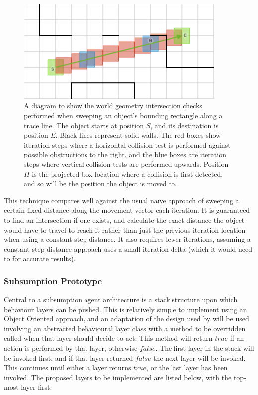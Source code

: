 \documentclass[12pt,a4paper]{article}
\begin{document}
\begin{figure}[h]
\centering
\includegraphics[width=0.9\textwidth]{trace}
\caption{A diagram to show the world geometry intersection checks performed when sweeping an object's bounding rectangle along a trace line. The object starts at position $S$, and its destination is position $E$. Black lines represent solid walls. The red boxes show iteration steps where a horizontal collision test is performed against possible obstructions to the right, and the blue boxes are iteration steps where vertical collision tests are performed upwards. Position $H$ is the projected box location where a collision is first detected, and so will be the position the object is moved to.}
\label{fig:trace}
\end{figure}

This technique compares well against the usual na\"{i}ve approach of sweeping a certain fixed distance along the movement vector each iteration. It is guaranteed to find an intersection if one exists, and calculate the exact distance the object would have to travel to reach it rather than just the previous iteration location when using a constant step distance. It also requires fewer iterations, assuming a constant step distance approach uses a small iteration delta (which it would need to for accurate results).

\subsubsection{Subsumption Prototype}\noindent
Central to a subsumption agent architecture is a stack structure upon which behaviour layers can be pushed. This is relatively simple to implement using an Object Oriented approach, and an adaptation of the design used by  \citeyear{butler01} will be used involving an abstracted behavioural layer class with a method to be overridden called when that layer should decide to act. This method will return $true$ if an action is performed by that layer, otherwise $false$. The first layer in the stack will be invoked first, and if that layer returned $false$ the next layer will be invoked. This continues until either a layer returns $true$, or the last layer has been invoked. The proposed layers to be implemented are listed below, with the top-most layer first.
\end{document}
